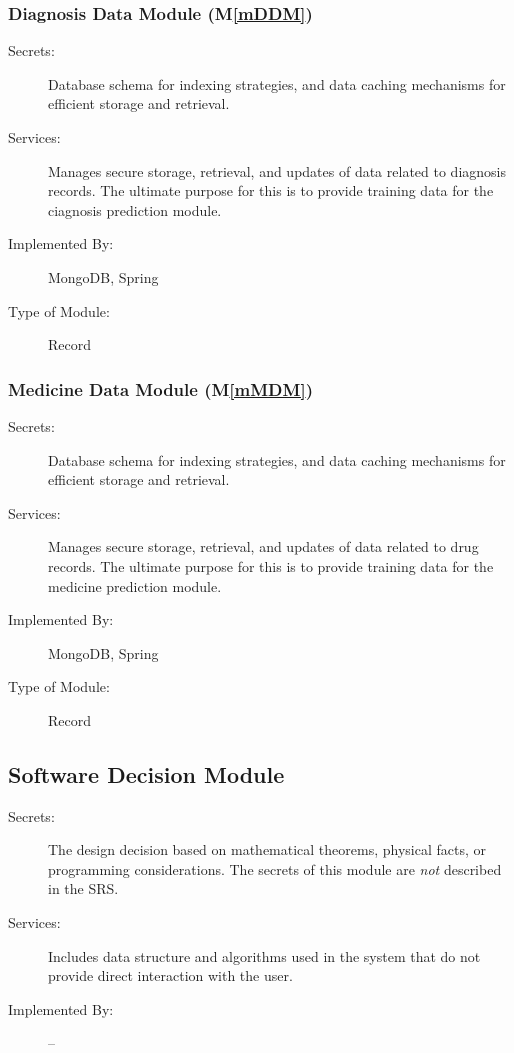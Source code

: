 \documentclass[12pt, titlepage]{article}
\newcommand{\mref}[1]{M\ref{#1}}
\begin{document}
\subsubsection{Diagnosis Data Module (\mref{mDDM})}

\begin{description}
  \item[Secrets:]Database schema for indexing strategies, and data caching mechanisms for efficient storage and retrieval.
  \item[Services:]Manages secure storage, retrieval, and updates of data related to diagnosis records. The ultimate purpose for this is to provide training data for the ciagnosis prediction module.
  \item[Implemented By:]MongoDB, Spring
  \item[Type of Module:]Record
\end{description}

\subsubsection{Medicine Data Module (\mref{mMDM})}

\begin{description}
  \item[Secrets:]Database schema for indexing strategies, and data caching mechanisms for efficient storage and retrieval.
  \item[Services:]Manages secure storage, retrieval, and updates of data related to drug records. The ultimate purpose for this is to provide training data for the medicine prediction module.
  \item[Implemented By:]MongoDB, Spring
  \item[Type of Module:]Record
\end{description}


\subsection{Software Decision Module}

\begin{description}
\item[Secrets:] The design decision based on mathematical theorems, physical facts, or programming considerations. The secrets of this module are
  \emph{not} described in the SRS.
\item[Services:] Includes data structure and algorithms used in the system that do not provide direct interaction with the user. 
\item[Implemented By:] --
\end{description}
\end{document}
